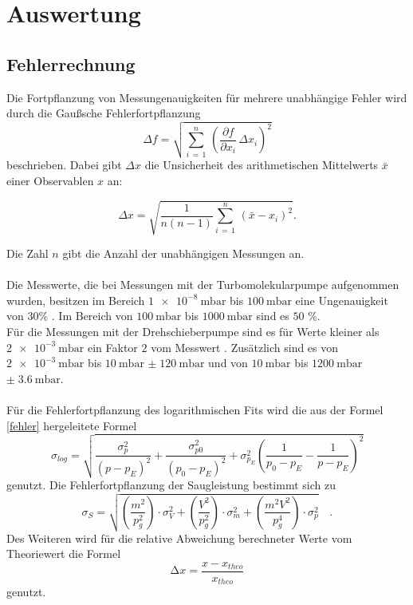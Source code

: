 \newpage 
\section{Auswertung}

        \subsection{Fehlerrechnung}
        \noindent
        Die Fortpflanzung von Messungenauigkeiten für mehrere unabhängige Fehler wird durch die Gaußsche Fehlerfortpflanzung
        \begin{equation*}
        \Delta f = \sqrt{\sum_{i \, = \, 1}^{n} \, \left(\frac{\partial f}{\partial x_i} \, \Delta x_i\right)^2}
        \label{fehler}
        \end{equation*}
        beschrieben. Dabei gibt $\Delta x$ die Unsicherheit des arithmetischen Mittelwerts $\bar{x}$ einer Observablen $x$ an:
        
        \begin{equation*}
        \Delta x =  \sqrt{\frac{1}{n(n-1)} \sum_{i \, = \, 1}^{n} \, \left(\bar{x}- x_i\right)^2}.
        \end{equation*}

        \noindent
        Die Zahl $n$ gibt die Anzahl der unabhängigen Messungen an.\\\\
        Die Messwerte, die bei Messungen mit der Turbomolekularpumpe aufgenommen wurden, besitzen im Bereich $\SI{1e-8}{\milli\bar}$ bis $\SI{100}{\milli\bar}$ eine Ungenauigkeit von $30$\% \cite{V70}.
        Im Bereich von $\SI{100}{\milli\bar}$ bis $\SI{1000}{\milli\bar}$ sind es $50$ \%.\\
        Für die Messungen mit der Drehschieberpumpe sind es für Werte kleiner als $\SI{2e-3}{\milli\bar}$ ein Faktor $2$ vom Messwert \cite{V70}.
        Zusätzlich sind es von $\SI{2e-3}{\milli\bar}$ bis $\SI{10}{\milli\bar}$ $\pm\; \SI{120}{\milli\bar}$ 
        und von $\SI{10}{\milli\bar}$ bis $\SI{1200}{\milli\bar}$ $\pm \;\SI{3.6}{\milli\bar}$.\\\\
        Für die Fehlerfortpflanzung des logarithmischen Fits wird die aus der Formel \ref*{fehler} hergeleitete Formel 
        \begin{equation*}
          \sigma_{log} = \sqrt{\frac{\sigma_p^2}{(p-p_E)^2}+\frac{\sigma_{p0}^2}{(p_0-p_E)^2}+\sigma_{p_E}^2 \left(\frac{1}{p_0-p_E}-\frac{1}{p-p_E}\right)^2}
        \end{equation*}
        genutzt. Die Fehlerfortpflanzung der Saugleistung bestimmt sich zu
        \begin{equation*}
          \sigma_{S} = \sqrt{\left(\frac{m^2}{p_g^2}\right) \cdot \sigma_{V}^2 + \left(\frac{V^2}{p_g^2}\right) \cdot \sigma_m^2 + \left(\frac{m^2 V^2}{p_g^4}\right) \cdot \sigma_p^2} \quad .
        \end{equation*}
        Des Weiteren wird für die relative Abweichung berechneter Werte vom Theoriewert die Formel 
        \begin{equation*}
          \increment x = \frac{x - x_{theo}}{x_{theo}}
        \end{equation*}
        genutzt.

